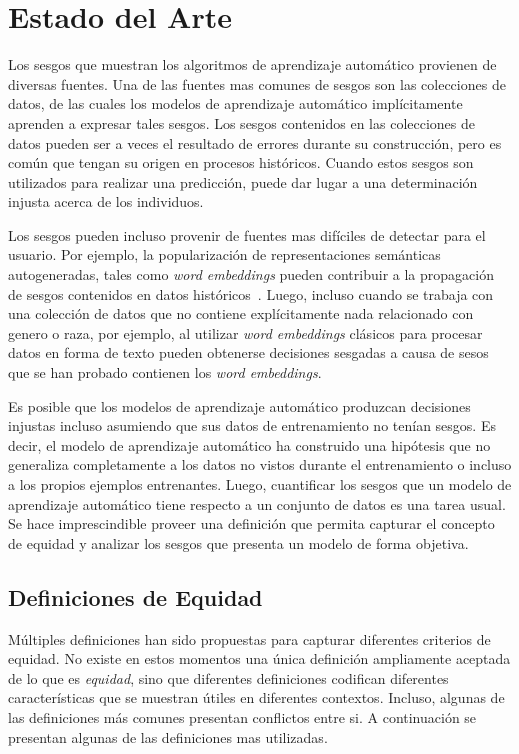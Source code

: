 \chapter{Estado del Arte}\label{chapter:state-of-the-art}

Los sesgos que muestran los algoritmos de aprendizaje automático provienen de diversas fuentes.
Una de las fuentes mas comunes de sesgos son las colecciones de datos, de las cuales los modelos de aprendizaje automático implícitamente aprenden a expresar tales sesgos.
Los sesgos contenidos en las colecciones de datos pueden ser a veces el resultado de errores durante su construcción,  pero es común que tengan su origen en procesos históricos.
Cuando estos sesgos son utilizados para realizar una predicción, puede dar lugar a una determinación injusta acerca de los individuos.

Los sesgos pueden incluso provenir de fuentes mas difíciles de detectar para el usuario.
Por ejemplo, la popularización de representaciones semánticas autogeneradas, tales como \emph{word embeddings} pueden contribuir a la propagación de sesgos contenidos en datos históricos~\parencite{bolukbasi2016man}.
Luego, incluso cuando se trabaja con una colección de datos que no contiene explícitamente nada relacionado con genero o raza, por ejemplo, al utilizar \emph{word embeddings} clásicos para procesar datos en forma de texto pueden obtenerse decisiones sesgadas a causa de sesos que se han probado contienen los \emph{word embeddings}.

Es posible que los modelos de aprendizaje automático produzcan decisiones injustas incluso asumiendo que sus datos de entrenamiento no tenían sesgos.
Es decir, el modelo de aprendizaje automático ha construido una hipótesis que no generaliza completamente a los datos no vistos durante el entrenamiento o incluso a los propios ejemplos entrenantes.
Luego, cuantificar los sesgos que un modelo de aprendizaje automático tiene respecto a un conjunto de datos es una tarea usual.
Se hace imprescindible proveer una definición que permita capturar el concepto de equidad y analizar los sesgos que presenta un modelo de forma objetiva.

\section{Definiciones de Equidad}

Múltiples definiciones han sido propuestas para capturar diferentes criterios de equidad.
No existe en estos momentos una única definición ampliamente aceptada de lo que es \textit{equidad}, sino que diferentes definiciones codifican diferentes características que se muestran útiles en diferentes contextos.
Incluso, algunas de las definiciones más comunes presentan conflictos entre si.
A continuación se presentan algunas de las definiciones mas utilizadas. 

